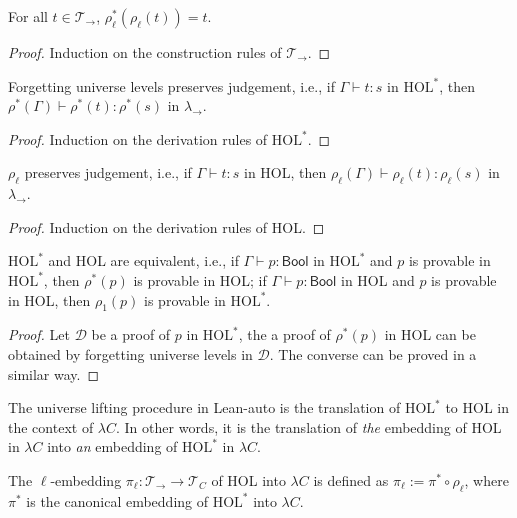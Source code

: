   \begin{theorem}
    For all $t \in \mathcal{T}_\to$, $\rho_\ell^*(\rho_\ell(t)) = t$.
    \begin{proof} Induction on the construction rules of $\mathcal{T}_\to$. \end{proof}
  \end{theorem}

  \begin{theorem}
    Forgetting universe levels preserves judgement, i.e., if $\Gamma \vdash t : s$ in $\text{HOL}^*$,
    then $\rho^*(\Gamma) \vdash \rho^*(t) : \rho^*(s)$ in $\lambda_\to$.
    \begin{proof} Induction on the derivation rules of $\text{HOL}^*$. \end{proof}
  \end{theorem}

  \begin{theorem}
    $\rho_\ell$ preserves judgement, i.e., if $\Gamma \vdash t : s$ in HOL, then
    $\rho_\ell(\Gamma) \vdash \rho_\ell(t) : \rho_\ell(s)$ in $\lambda_\to$.
    \begin{proof} Induction on the derivation rules of HOL. \end{proof}
  \end{theorem}

  \begin{theorem}
    $\text{HOL}^*$ and HOL are equivalent, i.e., if $\Gamma \vdash p : \mathsf{Bool}$ in $\text{HOL}^*$
    and $p$ is provable in $\text{HOL}^*$, then $\rho^*(p)$ is provable in HOL; if $\Gamma \vdash p : \mathsf{Bool}$
    in HOL and $p$ is provable in HOL, then $\rho_1(p)$ is provable in $\text{HOL}^*$.
    \begin{proof}
      Let $\mathcal{D}$ be a proof of $p$ in $\text{HOL}^*$, the a proof of
      $\rho^*(p)$ in HOL can be obtained by forgetting universe levels in $\mathcal{D}$.
      The converse can be proved in a similar way.
    \end{proof}
  \end{theorem}

  \noindent The universe lifting procedure in Lean-auto is the translation of $\text{HOL}^*$
  to HOL in the context of $\lambda C$. In other words, it is the translation of \textit{the}
  embedding of HOL in $\lambda C$ into \textit{an} embedding of $\text{HOL}^*$ in $\lambda C$.

  \begin{definition}
    The $\ell$-embedding $\pi_\ell : \mathcal{T}_\to \to \mathcal{T}_C$ of HOL into
    $\lambda C$ is defined as $\pi_\ell := \pi^* \circ \rho_\ell$, where $\pi^*$ is the
    canonical embedding of $\text{HOL}^*$ into $\lambda C$.
  \end{definition}

